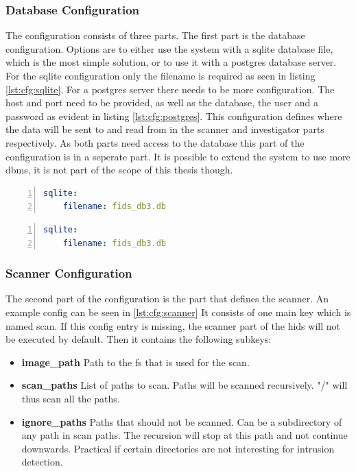 \documentclass[
	a4paper,					%
	10pt,							%
	twoside,					%
	openright,				%
	notitlepage,			%
	parskip=half,			%
]{scrreprt}					%
\begin{document}
\subsubsection{Database Configuration}

The configuration consists of three parts. The first part is the database configuration. Options are to either use the system with a \gls{sqlite} database file, which is the most simple solution, or to use it with a \gls{postgres} database server. For the sqlite configuration only the filename is required as seen in listing \ref{lst:cfg:sqlite}. For a postgres server there needs to be more configuration. The host and port need to be provided, as well as the database, the user and a password as evident in listing \ref{lst:cfg:postgres}. This configuration defines where the data will be sent to and read from in the scanner and investigator parts respectively. As both parts need access to the database this part of the configuration is in a seperate part. It is possible to extend the system to use more \gls{dbms}, it is not part of the scope of this thesis though.

\begin{lstlisting}[language=yaml, numbers=left, caption=SQLite Configuration, label=lst:cfg:sqlite]
sqlite:
	filename: fids_db3.db
\end{lstlisting}


\begin{lstlisting}[language=yaml, numbers=left, caption=Postgres Configuration, label=lst:cfg:postgres]
sqlite:
	filename: fids_db3.db
\end{lstlisting}

\subsubsection{Scanner Configuration}

The second part of the configuration is the part that defines the scanner. An example config can be seen in \ref{lst:cfg:scanner} It consists of one main key which is named scan. If this config entry is missing, the scanner part of the \gls{hids} will not be executed by default. Then it contains the following subkeys:

\begin{itemize}
	\item		\textbf{image\_path} Path to the \gls{fs} that is used for the scan.
	\item		\textbf{scan\_paths} List of paths to scan. Paths will be scanned recursively. "/" will thus scan all the paths.
	\item		\textbf{ignore\_paths} Paths that should not be scanned. Can be a subdirectory of any path in scan paths. The recursion will stop at this path and not continue downwards. Practical if certain directories are not interesting for intrusion detection.
\end{itemize}
\end{document}
